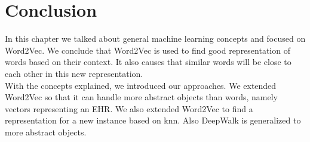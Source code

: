 \section{Conclusion}
In this chapter we talked about general machine learning concepts and focused on Word2Vec. We conclude that Word2Vec is used to find good representation of words based on their context. It also causes that similar words will be close to each other in this new representation. \\

With the concepts explained, we introduced our approaches. We extended Word2Vec so that it can handle more abstract objects than words, namely vectors representing an EHR. We also extended Word2Vec to find a representation for a new instance based on knn. Also DeepWalk is generalized to more abstract objects.



